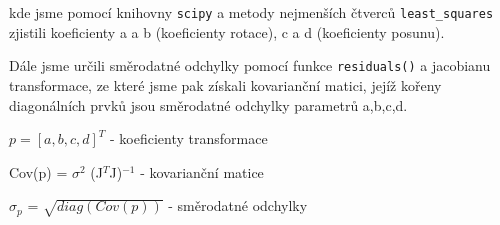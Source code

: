 \documentclass[a4paper,11pt]{article}
\begin{document}
\begin{minipage}[t]{0.5\textwidth}
                \par kde jsme pomocí knihovny \texttt{scipy} a metody nejmenších čtverců \texttt{least\_squares} zjistili koeficienty a a b (koeficienty rotace), c a d (koeficienty posunu).
                
                \par Dále jsme určili směrodatné odchylky pomocí funkce \texttt{residuals()} a jacobianu transformace, ze které jsme pak získali kovarianční matici, jejíž kořeny diagonálních prvků jsou směrodatné odchylky parametrů a,b,c,d. 

                \begin{center}
                    $p=[a,b,c,d]^T$ - koeficienty transformace
                    \vspace{5pt}
                    \par Cov(p) = $\sigma^2$ (J$^T$J)$^{-1}$ - kovarianční matice
                    \vspace{5pt}
                    \par $\sigma_{p}$ = $\sqrt{diag(Cov(p))}$ - směrodatné odchylky
                \end{center}
    \end{minipage}
\newpage
\end{document}

